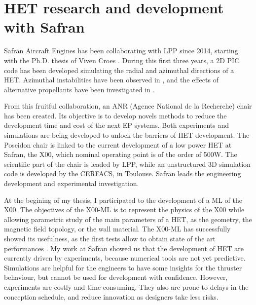 

\section*{\ac{HET} research and development with Safran}
\label{sec-poseidon}



Safran Aircraft Engines has been collaborating with \ac{LPP} since 2014, starting with the Ph.D. thesis of Viven Croes \citep{croes2017}.
During this first three years, a \ac{2D} \ac{PIC} code has been developed simulating the radial and azimuthal directions of a \ac{HET}.
Azimuthal instabilities have been observed in \citet{croes2017a}, and the effects of alternative propellants have been investigated in \citet{croes2018}.

From this fruitful collaboration, an ANR (Agence National de la Recherche) chair has been created.
Its objective is to develop novels methods to reduce the development time and cost of the next \ac{EP} systems.
Both experiments and simulations are being developed to unlock the barriers of \ac{HET} development.
The {\sc Poseidon} chair is linked to the current development of a  low power \ac{HET} at Safran, the \PPS X00, which nominal operating point is of the order of 500W.
The scientific part of the chair is leaded by \ac{LPP}, while an unstructured \ac{3D} simulation code is developed by the CERFACS, in Toulouse.
Safran leads the engineering development and experimental investigation.

At the begining of my thesis, I participated to the development of a \ac{ML} of the \PPS X00.
The objectives of the \PPS X00-\ac{ML}  is to represent the physics of the \PPS X00 while allowing parametric study of the main parameters of a \ac{HET}, as the geometry, the magnetic field topology, or the wall material.
The \PPS X00-\ac{ML} has successfully showed its usefulness, as the first tests allow to obtain state of the art performances \citep{vaudolon2018}.
My work at Safran showed us that the development of \ac{HET} are currently driven by experiments, because numerical tools are not yet predictive.
Simulations are helpful for the engineers to have some insights for the thruster behaviour, but cannot be used for development with confidence.
However, experiments are costly and time-consuming.
They also are prone to delays in the conception schedule, and reduce innovation as designers take less risks.

